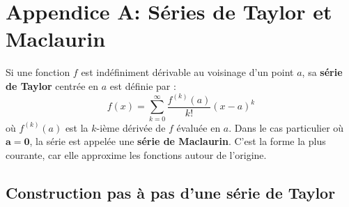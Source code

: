 \newpage

\section{Appendice A: Séries de Taylor et Maclaurin}

\begin{definitionbox}
Si une fonction $f$ est indéfiniment dérivable au voisinage d'un point $a$, sa \textbf{série de Taylor} centrée en $a$ est définie par :
$$ f(x) = \sum_{k=0}^{\infty} \frac{f^{(k)}(a)}{k!} (x-a)^k $$
où $f^{(k)}(a)$ est la $k$-ième dérivée de $f$ évaluée en $a$.
\newline
\newline
Dans le cas particulier où $\mathbf{a=0}$, la série est appelée une \textbf{série de Maclaurin}. C'est la forme la plus courante, car elle approxime les fonctions autour de l'origine.
\end{definitionbox}

\subsection{Construction pas à pas d'une série de Taylor}

